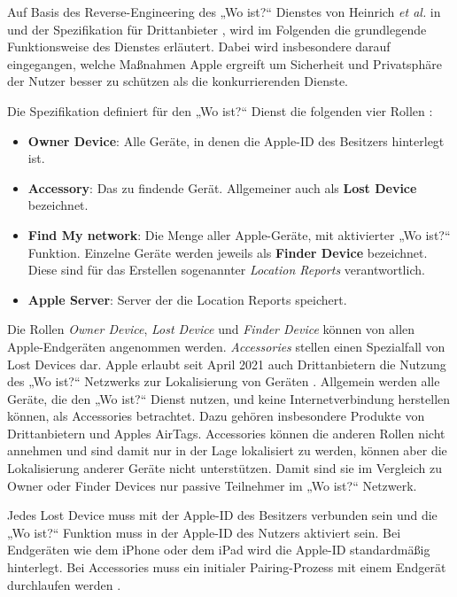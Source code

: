 Auf Basis des Reverse-Engineering des „Wo ist?“ Dienstes von Heinrich \textit{et al.} in \cite{Heinrich_FindMy} und der Spezifikation für Drittanbieter \cite{Apple_FindMySpec}, wird im Folgenden die grundlegende Funktionsweise des Dienstes erläutert.
Dabei wird insbesondere darauf eingegangen, welche Maßnahmen Apple ergreift um Sicherheit und Privatsphäre der Nutzer besser zu schützen als die konkurrierenden Dienste. 

Die Spezifikation definiert für den „Wo ist?“ Dienst die folgenden vier Rollen \cite{Apple_FindMySpec}:
\begin{itemize}
    \item \textbf{Owner Device}: Alle Geräte, in denen die Apple-ID des Besitzers hinterlegt ist.
    \item \textbf{Accessory}: Das zu findende Gerät. Allgemeiner auch als \textbf{Lost Device} bezeichnet.
    \item \textbf{Find My network}: Die Menge aller Apple-Geräte, mit aktivierter „Wo ist?“ Funktion. Einzelne Geräte werden jeweils als \textbf{Finder Device} bezeichnet. Diese sind für das Erstellen sogenannter \textit{Location Reports} verantwortlich.
    \item \textbf{Apple Server}: Server der die Location Reports speichert.
\end{itemize}
Die Rollen \textit{Owner Device}, \textit{Lost Device} und \textit{Finder Device} können von allen Apple-Endgeräten angenommen werden.
\textit{Accessories} stellen einen Spezialfall von Lost Devices dar.
Apple erlaubt seit April 2021 auch Drittanbietern die Nutzung des „Wo ist?“ Netzwerks zur Lokalisierung von Geräten \cite{Apple_FindMy3rdParty}.
Allgemein werden alle Geräte, die den „Wo ist?“ Dienst nutzen, und keine Internetverbindung herstellen können, als Accessories betrachtet.
Dazu gehören insbesondere Produkte von Drittanbietern und Apples AirTags.
Accessories können die anderen Rollen nicht annehmen und sind damit nur in der Lage lokalisiert zu werden, können aber die Lokalisierung anderer Geräte nicht unterstützen.
Damit sind sie im Vergleich zu Owner oder Finder Devices nur passive Teilnehmer im „Wo ist?“ Netzwerk.

Jedes Lost Device muss mit der Apple-ID des Besitzers verbunden sein und die „Wo ist?“ Funktion muss in der Apple-ID des Nutzers aktiviert sein.
Bei Endgeräten wie dem iPhone oder dem iPad wird die Apple-ID standardmäßig hinterlegt.
Bei Accessories muss ein initialer Pairing-Prozess mit einem Endgerät durchlaufen werden \cite{Apple_FindMySpec}.

